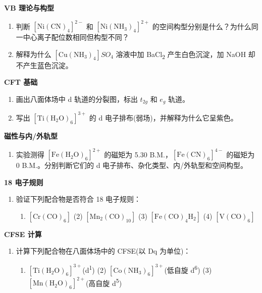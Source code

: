 \documentclass[a4paper,11pt]{ctexart}
\providecommand{\tightlist}{\setlength{\itemsep}{0pt}\setlength{\parskip}{0pt}}
\newcommand{\箭}{\ensuremath{\rightarrow}}
\newcommand{\左箭}{\ensuremath{\leftarrow}}
\newcommand{\上箭}{\ensuremath{\uparrow}}
\newcommand{\下箭}{\ensuremath{\downarrow}}
\newcommand{\衡}{\ensuremath{\rightleftharpoons}}
\newcommand{\双箭}{\ensuremath{\leftrightarrow}}
\newcommand{\约等于}{\ensuremath{\approx}}
\newcommand{\小于等于}{\ensuremath{\leq}}
\newcommand{\大于等于}{\ensuremath{\geq}}
\newcommand{\不等于}{\ensuremath{\neq}}
\newcommand{\西格马}{\ensuremath{\sigma}}
\newcommand{\派}{\ensuremath{\pi}}
\begin{document}
\textbf{VB 理论与构型}

\begin{enumerate}
\def\labelenumi{\arabic{enumi}.}
\setcounter{enumi}{2}
\item
  判断 \(\mathrm{[Ni(CN)_4]^{2-}}\) 和 \(\mathrm{[Ni(NH_3)_4]^{2+}}\) 的空间构型分别是什么？为什么同一中心离子配位数相同但构型不同？
\item
  解释为什么 \([\mathrm{Cu(NH_3)_4}]SO_4\) 溶液中加 BaCl\textsubscript{2} 产生白色沉淀，加 NaOH 却不产生蓝色沉淀。
\end{enumerate}

\textbf{CFT 基础}

\begin{enumerate}
\def\labelenumi{\arabic{enumi}.}
\setcounter{enumi}{4}
\item
  画出八面体场中 d 轨道的分裂图，标出 \(t_{2g}\) 和 \(e_g\) 轨道。
\item
  写出 \(\mathrm{[Ti(H_2O)_6]^{3+}}\) 的 d 电子排布(弱场)，并解释为什么它呈紫色。
\end{enumerate}

\textbf{磁性与内/外轨型}

\begin{enumerate}
\def\labelenumi{\arabic{enumi}.}
\setcounter{enumi}{6}
\tightlist
\item
  实验测得 \([\mathrm{Fe(H_2O)_6}]^{2+}\) 的磁矩为 5.30 B.M.，\([\mathrm{Fe(CN)_6}]^{4-}\) 的磁矩为 0 B.M.。分别判断它们的 d 电子排布、杂化类型、内/外轨型和空间构型。
\end{enumerate}

\textbf{18 电子规则}

\begin{enumerate}
\def\labelenumi{\arabic{enumi}.}
\setcounter{enumi}{7}
\tightlist
\item
  验证下列配合物是否符合 18 电子规则：

  \begin{enumerate}
  \def\labelenumii{(\arabic{enumii})}
  \tightlist
  \item
    \(\mathrm{[Cr(CO)_6]}\) (2) \(\mathrm{[Mn_2(CO)_{10}]}\) (3) \(\mathrm{[Fe(CO)_4H_2]}\) (4) \(\mathrm{[V(CO)_6]}\)
  \end{enumerate}
\end{enumerate}

\textbf{CFSE 计算}

\begin{enumerate}
\def\labelenumi{\arabic{enumi}.}
\setcounter{enumi}{8}
\tightlist
\item
  计算下列配合物在八面体场中的 CFSE(以 Dq 为单位)：

  \begin{enumerate}
  \def\labelenumii{(\arabic{enumii})}
  \tightlist
  \item
    \([\mathrm{Ti(H_2O)_6}]^{3+}\)(d\textsuperscript{1}) (2) \([\mathrm{Co(NH_3)_6}]^{3+}\)(低自旋 d\textsuperscript{6}) (3) \([\mathrm{Mn(H_2O)_6}]^{2+}\)(高自旋 d\textsuperscript{5})
  \end{enumerate}
\end{enumerate}
\end{document}
